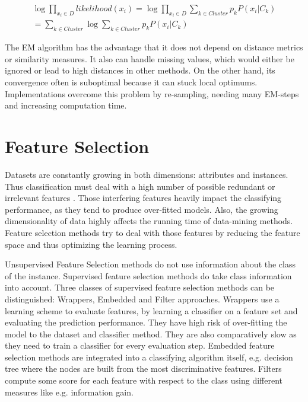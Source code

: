 					\begin{equation}
						\begin{split}
							\log \prod_{x_i\in D} likelihood(x_i) = \log \prod_{x_i\in D} \sum_{k\in Cluster} p_kP(x_i|C_k)\\
= \sum_{k\in Cluster}\log\sum_{k\in Cluster}p_kP(x_i|C_k)
						\end{split}
					\end{equation}

					The EM algorithm has the advantage that it does not depend on distance metrics or similarity measures. It also can handle missing values, which would either be ignored or lead to high distances in other methods. On the other hand, its convergence often is suboptimal because it can stuck local optimums. Implementations overcome this problem by re-sampling, needing many EM-steps and increasing computation time.

	\section{Feature Selection}
	\label{sec:featureselection}

		Datasets are constantly growing in both dimensions: attributes and instances. Thus classification must deal with a high number of possible redundant or irrelevant features \cite{Zheng10}. Those interfering features heavily impact the classifying performance, as they tend to produce over-fitted models. Also, the growing dimensionality of data highly affects the running time of data-mining methods. Feature selection methods try to deal with those features by reducing the feature space and thus optimizing the learning process.

		Unsupervised Feature Selection methods do not use information about the class of the instance. Supervised feature selection methods do take class information into account. Three classes of supervised feature selection methods can be distinguished: Wrappers, Embedded and Filter approaches. Wrappers use a learning scheme to evaluate features, by learning a classifier on a feature set and evaluating the prediction performance. They have high risk of over-fitting the model to the dataset and classifier method. They are also comparatively slow as they need to train a classifier for every evaluation step. Embedded feature selection methods are integrated into a classifying algorithm itself, e.g. decision tree where the nodes are built from the most discriminative features. Filters compute some score for each feature with respect to the class using different measures like e.g. information gain. 

